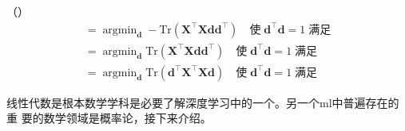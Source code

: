 （）
\begin{gather}
  = \mathop{\arg\min}_{\pmb{d}} -
  \mathrm{Tr}(\pmb{X}^{\top}\pmb{X}\pmb{d}\pmb{d}^{\top})
  \quad\text{使}\;\pmb{d}^{\top}\pmb{d} = 1\;\text{满足}\\
  = \mathop{\arg\min}_{\pmb{d}} 
  \mathrm{Tr}(\pmb{X}^{\top}\pmb{X}\pmb{d}\pmb{d}^{\top})
  \quad\text{使}\;\pmb{d}^{\top}\pmb{d} = 1\;\text{满足}\\
  = \mathop{\arg\min}_{\pmb{d}} 
  \mathrm{Tr}(\pmb{d}^{\top}\pmb{X}^{\top}\pmb{X}\pmb{d})
  \quad\text{使}\;\pmb{d}^{\top}\pmb{d} = 1\;\text{满足}
\end{gather}

线性代数是根本数学学科是必要了解深度学习中的一个。另一个\gls*{ml}中普遍存在的重
要的数学领域是概率论，接下来介绍。
